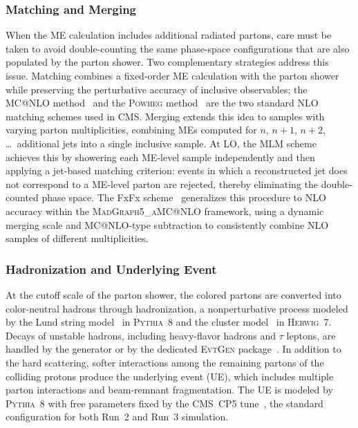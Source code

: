 \subsubsection*{Matching and Merging}

When the ME calculation includes additional radiated partons, care must be taken to avoid double-counting the same phase-space configurations that are also populated by the parton shower. Two complementary strategies address this issue. Matching combines a fixed-order ME calculation with the parton shower while preserving the perturbative accuracy of inclusive observables; the MC@NLO method~\cite{Frixione:2002ik} and the \textsc{Powheg} method~\cite{Nason:2004rx} are the two standard NLO matching schemes used in CMS. Merging extends this idea to samples with varying parton multiplicities, combining MEs computed for $n$, $n{+}1$, $n{+}2$, \ldots\ additional jets into a single inclusive sample. At LO, the MLM scheme~\cite{Alwall:2007fs} achieves this by showering each ME-level sample independently and then applying a jet-based matching criterion: events in which a reconstructed jet does not correspond to a ME-level parton are rejected, thereby eliminating the double-counted phase space. The FxFx scheme~\cite{Frederix:2012ps} generalizes this procedure to NLO accuracy within the \textsc{MadGraph5\_aMC@NLO} framework, using a dynamic merging scale and MC@NLO-type subtraction to consistently combine NLO samples of different multiplicities.

\subsubsection*{Hadronization and Underlying Event}

At the cutoff scale of the parton shower, the colored partons are converted into color-neutral hadrons through hadronization, a nonperturbative process modeled by the Lund string model~\cite{Andersson:1983ia} in \textsc{Pythia}~8 and the cluster model~\cite{Webber:1983if} in \textsc{Herwig}~7. Decays of unstable hadrons, including heavy-flavor hadrons and $\tau$ leptons, are handled by the generator or by the dedicated \textsc{EvtGen} package~\cite{Lange:2001uf}. In addition to the hard scattering, softer interactions among the remaining partons of the colliding protons produce the underlying event (UE), which includes multiple parton interactions and beam-remnant fragmentation. The UE is modeled by \textsc{Pythia}~8 with free parameters fixed by the CMS~CP5 tune~\cite{CMS:2019csb}, the standard configuration for both Run~2 and Run~3 simulation.

